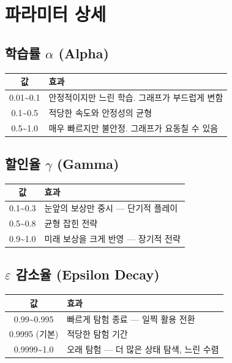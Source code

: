 \documentclass[11pt,a4paper]{article}
\begin{document}
\section{파라미터 상세}

\subsection{학습률 \(\alpha\) (Alpha)}

\begin{center}
\renewcommand{\arraystretch}{1.4}
\begin{tabular}{|c|p{9cm}|}
\hline
\rowcolor{tableheader}
\textbf{값} & \textbf{효과} \\
\hline
0.01\textasciitilde0.1 & 안정적이지만 느린 학습. 그래프가 부드럽게 변함 \\
\hline
0.1\textasciitilde0.5 & 적당한 속도와 안정성의 균형 \\
\hline
0.5\textasciitilde1.0 & 매우 빠르지만 불안정. 그래프가 요동칠 수 있음 \\
\hline
\end{tabular}
\end{center}

\subsection{할인율 \(\gamma\) (Gamma)}

\begin{center}
\renewcommand{\arraystretch}{1.4}
\begin{tabular}{|c|p{9cm}|}
\hline
\rowcolor{tableheader}
\textbf{값} & \textbf{효과} \\
\hline
0.1\textasciitilde0.3 & 눈앞의 보상만 중시 — 단기적 플레이 \\
\hline
0.5\textasciitilde0.8 & 균형 잡힌 전략 \\
\hline
0.9\textasciitilde1.0 & 미래 보상을 크게 반영 — 장기적 전략 \\
\hline
\end{tabular}
\end{center}

\subsection{\(\varepsilon\) 감소율 (Epsilon Decay)}

\begin{center}
\renewcommand{\arraystretch}{1.4}
\begin{tabular}{|c|p{9cm}|}
\hline
\rowcolor{tableheader}
\textbf{값} & \textbf{효과} \\
\hline
0.99\textasciitilde0.995 & 빠르게 탐험 종료 — 일찍 활용 전환 \\
\hline
0.9995 (기본) & 적당한 탐험 기간 \\
\hline
0.9999\textasciitilde1.0 & 오래 탐험 — 더 많은 상태 탐색, 느린 수렴 \\
\hline
\end{tabular}
\end{center}
\end{document}
